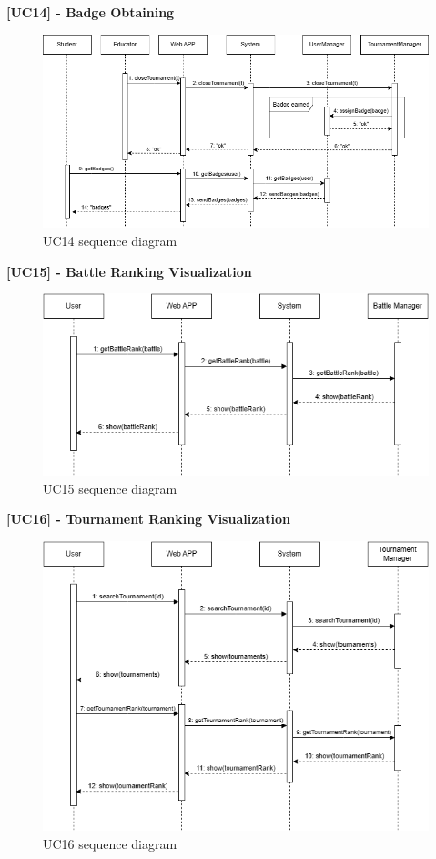 \textbf{[UC14] - Badge Obtaining}
\begin{figure}[H]
    \centering
    \includegraphics[width=1\linewidth]{Images/SD_BadgeAssignment.png}
    \caption{UC14 sequence diagram}
    \label{fig:uc14}
\end{figure}

\newpage

\textbf{[UC15] - Battle Ranking Visualization}
\begin{figure}[H]
    \centering
    \includegraphics[width=1\linewidth]{Images/SD_BattleRank.png}
    \caption{UC15 sequence diagram}
    \label{fig:uc15}
\end{figure}

\textbf{[UC16] - Tournament Ranking Visualization}
\begin{figure}[H]
    \centering
    \includegraphics[width=1\linewidth]{Images/SD_TournamentRank.png}
    \caption{UC16 sequence diagram}
    \label{fig:uc16}
\end{figure}

